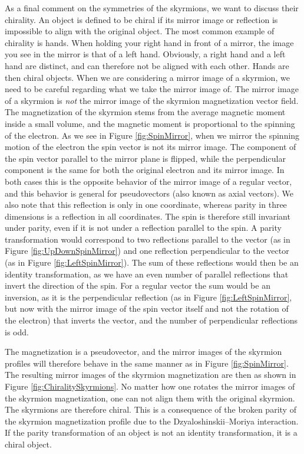 As a final comment on the symmetries of the skyrmions, we want to discuss their chirality. An object is defined to be chiral if its mirror image or reflection is impossible to align with the original object. The most common example of chirality is hands. When holding your right hand in front of a mirror, the image you see in the mirror is that of a left hand. Obviously, a right hand and a left hand are distinct, and can therefore not be aligned with each other. Hands are then chiral objects. When we are considering a mirror image of a skyrmion, we need to be careful regarding what we take the mirror image of. The mirror image of a skyrmion is \textit{not} the mirror image of the skyrmion magnetization vector field. The magnetization of the skyrmion stems from the average magnetic moment inside a small volume, and the magnetic moment is proportional to the spinning of the electron. As we see in Figure \ref{fig:SpinMirror}, when we mirror the spinning motion of the electron the spin vector is not its mirror image. The component of the spin vector parallel to the mirror plane is flipped, while the perpendicular component is the same for both the original electron and its mirror image. In both cases this is the opposite behavior of the mirror image of a regular vector, and this behavior is general for pseudovectors (also known as axial vectors). We also note that this reflection is only in one coordinate, whereas parity in three dimensions is a reflection in all coordinates. The spin is therefore still invariant under parity, even if it is not under a reflection parallel to the spin. A parity transformation would correspond to two reflections parallel to the vector (as in Figure \ref{fig:UpDownSpinMirror}) and one reflection perpendicular to the vector (as in Figure \ref{fig:LeftSpinMirror}). The sum of these reflections would then be an identity transformation, as we have an even number of parallel reflections that invert the direction of the spin. For a regular vector the sum would be an inversion, as it is the perpendicular reflection (as in Figure \ref{fig:LeftSpinMirror}, but now with the mirror image of the spin vector itself and not the rotation of the electron) that inverts the vector, and the number of perpendicular reflections is odd. 

The magnetization is a pseudovector, and the mirror images of the skyrmion profiles will therefore behave in the same manner as in Figure \ref{fig:SpinMirror}. The resulting mirror images of the skyrmion magnetization are then as shown in Figure \ref{fig:ChiralitySkyrmions}. No matter how one rotates the mirror images of the skyrmion magnetization, one can not align them with the original skyrmion. The skyrmions are therefore chiral. This is a consequence of the broken parity of the skyrmion magnetization profile due to the Dzyaloshinskii--Moriya interaction. If the parity transformation of an object is not an identity transformation, it is a chiral object.

